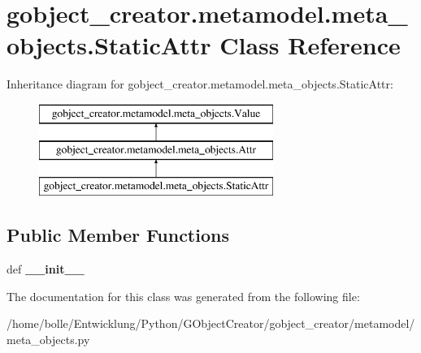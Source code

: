 \hypertarget{classgobject__creator_1_1metamodel_1_1meta__objects_1_1StaticAttr}{
\section{gobject\_\-creator.metamodel.meta\_\-objects.StaticAttr Class Reference}
\label{classgobject__creator_1_1metamodel_1_1meta__objects_1_1StaticAttr}
}
Inheritance diagram for gobject\_\-creator.metamodel.meta\_\-objects.StaticAttr:\begin{figure}[H]
\begin{center}
\leavevmode
\includegraphics[height=3cm]{classgobject__creator_1_1metamodel_1_1meta__objects_1_1StaticAttr}
\end{center}
\end{figure}
\subsection*{Public Member Functions}
\begin{DoxyCompactItemize}
\item 
\hypertarget{classgobject__creator_1_1metamodel_1_1meta__objects_1_1StaticAttr_a7f1894cffa61b9523de22be9937357fc}{
def {\bfseries \_\-\_\-init\_\-\_\-}}
\label{classgobject__creator_1_1metamodel_1_1meta__objects_1_1StaticAttr_a7f1894cffa61b9523de22be9937357fc}

\end{DoxyCompactItemize}


The documentation for this class was generated from the following file:\begin{DoxyCompactItemize}
\item 
/home/bolle/Entwicklung/Python/GObjectCreator/gobject\_\-creator/metamodel/meta\_\-objects.py\end{DoxyCompactItemize}
